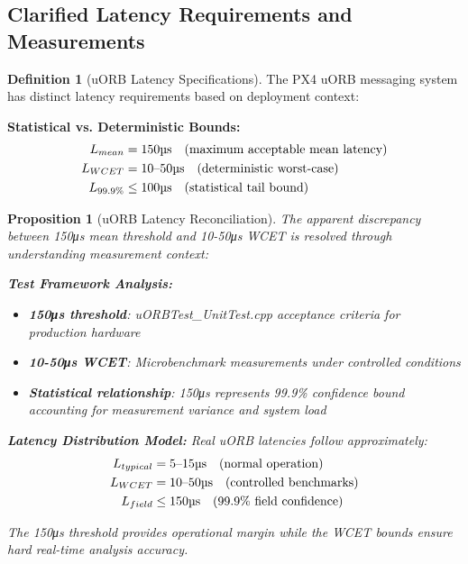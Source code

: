 \documentclass[11pt,a4paper]{article}
\newtheorem{proposition}[theorem]{Proposition}
\theoremstyle{definition}
\newtheorem{definition}[theorem]{Definition}
\theoremstyle{remark}
\begin{document}
\subsection{Clarified Latency Requirements and Measurements}

\begin{definition}[uORB Latency Specifications]
The PX4 uORB messaging system has distinct latency requirements based on deployment context:

\textbf{Statistical vs. Deterministic Bounds:}
\begin{align}
L_{mean} &= 150\text{\textmu s} \quad \text{(maximum acceptable mean latency)} \\
L_{WCET} &= 10\text{--}50\text{\textmu s} \quad \text{(deterministic worst-case)} \\
L_{99.9\%} &\leq 100\text{\textmu s} \quad \text{(statistical tail bound)}
\end{align}
\end{definition}

\begin{proposition}[uORB Latency Reconciliation]
The apparent discrepancy between 150μs mean threshold and 10-50μs WCET is resolved through understanding measurement context:

\textbf{Test Framework Analysis:}
\begin{itemize}
\item \textbf{150μs threshold}: uORBTest\_UnitTest.cpp acceptance criteria for production hardware
\item \textbf{10-50μs WCET}: Microbenchmark measurements under controlled conditions
\item \textbf{Statistical relationship}: 150μs represents 99.9\% confidence bound accounting for measurement variance and system load
\end{itemize}

\textbf{Latency Distribution Model:}
Real uORB latencies follow approximately:
\begin{align}
L_{typical} &= 5\text{--}15\text{\textmu s} \quad \text{(normal operation)} \\
L_{WCET} &= 10\text{--}50\text{\textmu s} \quad \text{(controlled benchmarks)} \\
L_{field} &\leq 150\text{\textmu s} \quad \text{(99.9\% field confidence)}
\end{align}

The 150μs threshold provides operational margin while the WCET bounds ensure hard real-time analysis accuracy.
\end{proposition}
\end{document}
